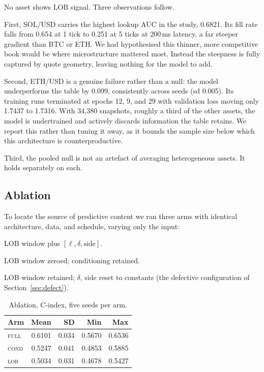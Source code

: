 \documentclass[11pt]{article}
\begin{document}
\noindent
No asset shows LOB signal. Three observations follow.

First, SOL/USD carries the highest lookup AUC in the study, 0.6821. Its fill
rate falls from 0.654 at 1 tick to 0.251 at 5 ticks at 200\,ms latency, a far
steeper gradient than BTC or ETH. We had hypothesised this thinner, more
competitive book would be where microstructure mattered most. Instead the
steepness is fully captured by quote geometry, leaving nothing for the model to
add.

Second, ETH/USD is a genuine failure rather than a null: the model
underperforms the table by 0.099, consistently across seeds (sd 0.005). Its
training runs terminated at epochs 12, 9, and 29 with validation loss moving
only 1.7437 to 1.7316. With 34{,}380 snapshots, roughly a third of the other
assets, the model is undertrained and actively discards information the table
retains. We report this rather than tuning it away, as it bounds the sample size
below which this architecture is counterproductive.

Third, the pooled null is not an artefact of averaging heterogeneous assets. It
holds separately on each.

\subsection{Ablation}
\label{sec:ablation}

To locate the source of predictive content we ran three arms with identical
architecture, data, and schedule, varying only the input:

\begin{description}[itemsep=2pt,topsep=4pt]
\item[\textsc{full}] LOB window plus $[\ell, \delta, \text{side}]$.
\item[\textsc{cond}] LOB window zeroed; conditioning retained.
\item[\textsc{lob}] LOB window retained; $\delta$, side reset to constants (the
defective configuration of Section~\ref{sec:defect}).
\end{description}

\begin{table}[h]
\centering
\caption{Ablation, C-index, five seeds per arm.}
\label{tab:ablation}
\begin{tabular}{lrrrr}
\toprule
Arm & Mean & SD & Min & Max \\
\midrule
\textsc{full} & 0.6101 & 0.034 & 0.5670 & 0.6536 \\
\textsc{cond} & 0.5247 & 0.041 & 0.4853 & 0.5885 \\
\textsc{lob}  & 0.5034 & 0.031 & 0.4678 & 0.5427 \\
\bottomrule
\end{tabular}
\end{table}
\end{document}
